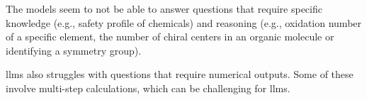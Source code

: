 The models seem to not be able to answer questions that require specific knowledge (e.g., safety profile of chemicals) and reasoning (e.g., oxidation number of a specific element, the number of chiral centers in an organic molecule or identifying a symmetry group).

\glspl{llm} also struggles with questions that require numerical outputs. Some of these involve multi-step calculations, which can be challenging for \glspl{llm}.\autocite{zhou2023llm_arithmetics}